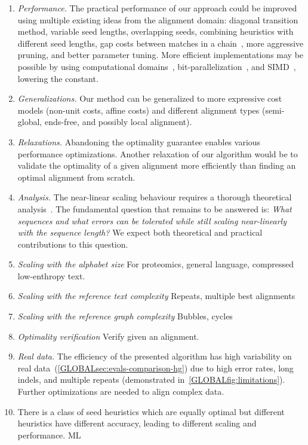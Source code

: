 \begin{enumerate}
    \item \emph{Performance.} The practical performance of our \A approach could
        be improved using multiple existing ideas from the alignment domain:
        diagonal transition method, variable seed lengths, overlapping seeds,
        combining heuristics with different seed lengths, gap costs between
        matches in a chain~\citep{ukkonen1985algorithms,wilbur1984context}, more
        aggressive pruning, and better parameter tuning. More efficient
        implementations may be possible by using computational
        domains~\citep{spouge1989speeding}, bit-parallelization~\citep{myers1999fast},
        and SIMD~\citep{marco2021fast}, lowering the \A constant.
    \item \emph{Generalizations.} Our method can be generalized to more
        expressive cost models (non-unit costs, affine costs) and different alignment
        types (semi-global, ends-free, and possibly local alignment).
    \item \emph{Relaxations.} Abandoning the optimality guarantee
        enables various performance optimizations. Another relaxation
        of our algorithm would be to validate the optimality of a given alignment more
        efficiently than finding an optimal alignment from scratch.
    \item \emph{Analysis.} The near-linear scaling behaviour requires a thorough
        theoretical analysis~\citep{medvedev2022limitations}. The fundamental
        question that remains to be answered is: \emph{What sequences and what
        errors can be tolerated while still scaling near-linearly with the
        sequence length?} We expect both theoretical and practical contributions
        to this question.
    \item \emph{Scaling with the alphabet size} For proteomics, general
        language, compressed low-enthropy text.
    \item \emph{Scaling with the reference text complexity} Repeats, multiple
        best alignments
    \item \emph{Scaling with the reference graph complexity} Bubbles, cycles
    \item \emph{Optimality verification} Verify given an alignment.
    \item \emph{Real data.} The efficiency of the presented algorithm has high
        variability on real data~(\cref{GLOBALsec:evals-comparison-hg}) due to high
        error rates, long indels, and multiple repeats (demonstrated
        in~\cref{GLOBALfig:limitations}). Further optimizations are needed to align
        complex data.
    \item There is a class of seed heuristics which are equally optimal but
        different heuristics have different accuracy, leading to different \A
        scaling and performance. ML
\end{enumerate}


